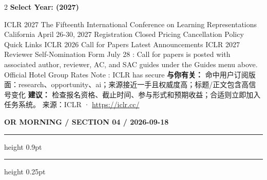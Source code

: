 \documentclass[10.5pt]{ctexart}
\begin{document}
\begin{multicols}{2}
{\large\bfseries Select Year: (2027)}\par
ICLR 2027 The Fifteenth International Conference on Learning Representations California April 26-30, 2027 Registration Closed Pricing Cancellation Policy Quick Links ICLR 2026 Call for Papers Latest Announcements ICLR 2027 Reviewer Self-Nomination Form July 28 : Call for papers is posted with associated author, reviewer, AC, and SAC guides under the Guides menu above. Official Hotel Group Rates Note : ICLR has secure
\textbf{与你有关：} 命中用户订阅版面：research、opportunity、ai；来源接近一手且权威度高；标题/正文包含高信号变化
\textbf{建议：} 检查报名资格、截止时间、参与形式和预期收益；合适则立即加入任务系统。
{\footnotesize\color{ormuted} 来源：ICLR · \url{https://iclr.cc/}}
\end{multicols}
\newpage
{\small\bfseries OR MORNING / SECTION 04 / 2026-09-18}
\vspace{2mm}
\hrule height 0.9pt
\vspace{1.5mm}
\hrule height 0.25pt
\vspace{4mm}
\end{document}
